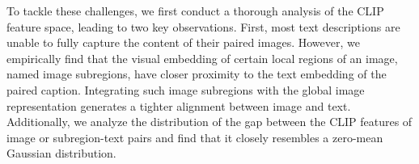 To tackle these challenges, we first conduct a thorough analysis of the CLIP feature space, leading to two key observations. First, most text descriptions are unable to fully capture the content of their paired images. However, we empirically find that the visual embedding of certain local regions of an image, named image subregions, have closer proximity to the text embedding of the paired caption. Integrating such image subregions with the global image representation generates a tighter alignment between image and text. Additionally, we analyze the distribution of the gap between the CLIP features of image or subregion-text pairs and find that it closely resembles a zero-mean Gaussian distribution.


